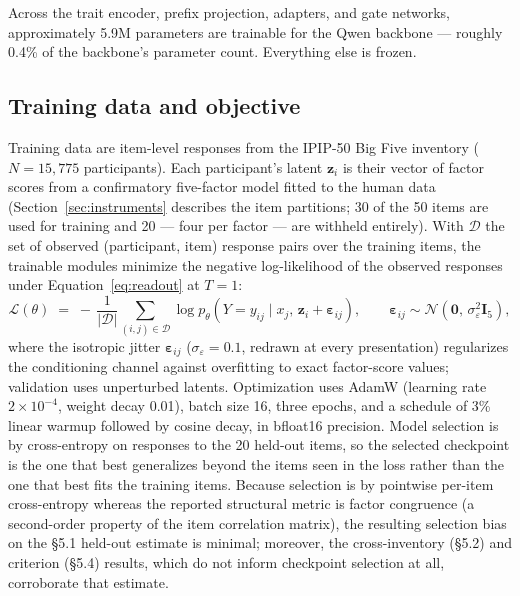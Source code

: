 \documentclass[11pt]{article}
\begin{document}
Across the trait encoder, prefix projection, adapters, and gate networks, approximately 5.9M parameters are trainable for the Qwen backbone --- roughly 0.4\% of the backbone's parameter count. Everything else is frozen.

\subsection{Training data and objective}
\label{sec:training}

Training data are item-level responses from the IPIP-50 Big Five inventory ($N = 15{,}775$ participants). Each participant's latent $\mathbf{z}_i$ is their vector of factor scores from a confirmatory five-factor model fitted to the human data (Section~\ref{sec:instruments} describes the item partitions; 30 of the 50 items are used for training and 20 --- four per factor --- are withheld entirely). With $\mathcal{D}$ the set of observed (participant, item) response pairs over the training items, the trainable modules minimize the negative log-likelihood of the observed responses under Equation~\ref{eq:readout} at $T = 1$:
\begin{equation}
\mathcal{L}(\theta) \;=\; -\,\frac{1}{|\mathcal{D}|} \sum_{(i,j) \in \mathcal{D}} \log p_\theta\!\left(Y = y_{ij} \mid x_j,\, \mathbf{z}_i + \boldsymbol{\varepsilon}_{ij}\right), \qquad \boldsymbol{\varepsilon}_{ij} \sim \mathcal{N}\!\left(\mathbf{0},\, \sigma_\varepsilon^2 \mathbf{I}_5\right),
\label{eq:loss}
\end{equation}
where the isotropic jitter $\boldsymbol{\varepsilon}_{ij}$ ($\sigma_\varepsilon = 0.1$, redrawn at every presentation) regularizes the conditioning channel against overfitting to exact factor-score values; validation uses unperturbed latents. Optimization uses AdamW (learning rate $2 \times 10^{-4}$, weight decay 0.01), batch size 16, three epochs, and a schedule of 3\% linear warmup followed by cosine decay, in bfloat16 precision. Model selection is by cross-entropy on responses to the 20 held-out items, so the selected checkpoint is the one that best generalizes beyond the items seen in the loss rather than the one that best fits the training items. Because selection is by pointwise per-item cross-entropy whereas the reported structural metric is factor congruence (a second-order property of the item correlation matrix), the resulting selection bias on the \S{}5.1 held-out estimate is minimal; moreover, the cross-inventory (\S{}5.2) and criterion (\S{}5.4) results, which do not inform checkpoint selection at all, corroborate that estimate.
\end{document}
